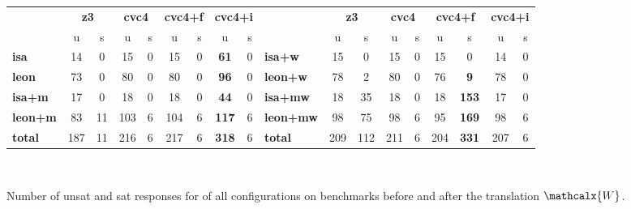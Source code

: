 \documentclass[runningheads,a4paper]{llncs}
\newcommand{\conv}{\mathcalx{W}}
\begin{document}
\begin{figure}[t]
\centering
{
\begin{tabular}{|l|cc|cc|cc|cc|l|cc|cc|cc|cc|}
\hline                                                                
  & \multicolumn{2}{c|}{{\bf z3}}     & \multicolumn{2}{c|}{{\bf cvc4}}     & \multicolumn{2}{c|}{{\bf cvc4+f}}     & \multicolumn{2}{c|}{{\bf cvc4+i}}     & & \multicolumn{2}{c|}{{\bf z3}}     & \multicolumn{2}{c|}{{\bf cvc4}}     & \multicolumn{2}{c|}{{\bf cvc4+f}}     & \multicolumn{2}{c|}{{\bf cvc4+i}}     
\\                                                                    
  & u & s & u & s & u & s & u & s & & u & s & u & s & u & s & u & s 
\\                                                                    
\hline                                                                    
{\bf isa} & 14  & 0 & 15  & 0 & 15  & 0 & {\bf 61}  & 0 & {\bf isa+w} & 15  & 0 & 15  & 0 & 15  & 0 & 14  & 0
\\                                                                  
{\bf leon}  & 73  & 0 & 80  & 0 & 80  & 0 & {\bf 96}  & 0 & {\bf leon+w}  & 78  & 2 & 80  & 0 & 76  & {\bf 9} & 78  & 0
\\                                                                   
{\bf isa+m} & 17  & 0 & 18  & 0 & 18  & 0 & {\bf 44}  & 0 & {\bf isa+mw}  & 18  & 35  & 18  & 0 & 18  & {\bf 153} & 17  & 0
\\                                                                  
{\bf leon+m}  & 83  & 11  & 103 & 6 & 104 & 6 & {\bf 117} & 6 & {\bf leon+mw} & 98  & 75  & 98  & 6 & 95  & {\bf 169} & 98  & 6
\\                                                                  
\hline                                                             
{\bf total} & 187 & 11  & 216 & 6 & 217 & 6 & {\bf 318} & 6 & {\bf total} & 209 & 112 & 211 & 6 & 204 & {\bf 331} & 207 & 6
\\                                                                                            
\hline                                                                                            
\end{tabular}
\\
}
\caption{Number of unsat and sat responses for of all configurations on benchmarks 
before and after the translation $\conv$.}
\label{fig:results}
\end{figure}
\end{document}
